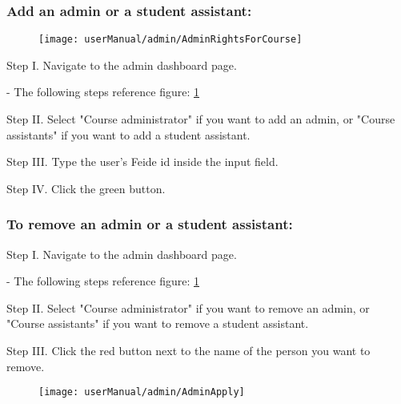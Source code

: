 \subsubsection{Add an admin or a student assistant:}

\begin{figure}[H]
    \texttt{[image: userManual/admin/AdminRightsForCourse]}
    \caption{}
    \label{fig:AdminRightsForCourse}
\end{figure}

\begin{userManualItemlist}
    \item[Step I.] Navigate to the admin dashboard page.
    \item[-] The following steps reference figure: \ref{fig:AdminRightsForCourse}
    \item[Step II.] Select "Course administrator" if you want to add an admin, or "Course assistants" if you want to add a student assistant.
    \item[Step III.] Type the user's Feide id inside the input field.
    \item[Step IV.] Click the green button.   
\end{userManualItemlist}

\subsubsection{To remove an admin or a student assistant:}
\begin{userManualItemlist}
    \item[Step I.] Navigate to the admin dashboard page.
    \item[-] The following steps reference figure: \ref{fig:AdminRightsForCourse} 
    \item[Step II.] Select "Course administrator" if you want to remove an admin, or "Course assistants" if you want to remove a student assistant.
    \item[Step III.] Click the red button next to the name of the person you want to remove.
\end{userManualItemlist}

\begin{figure}[H]
    \texttt{[image: userManual/admin/AdminApply]}
    \caption{}
    \label{fig:AdminApply}
\end{figure}

